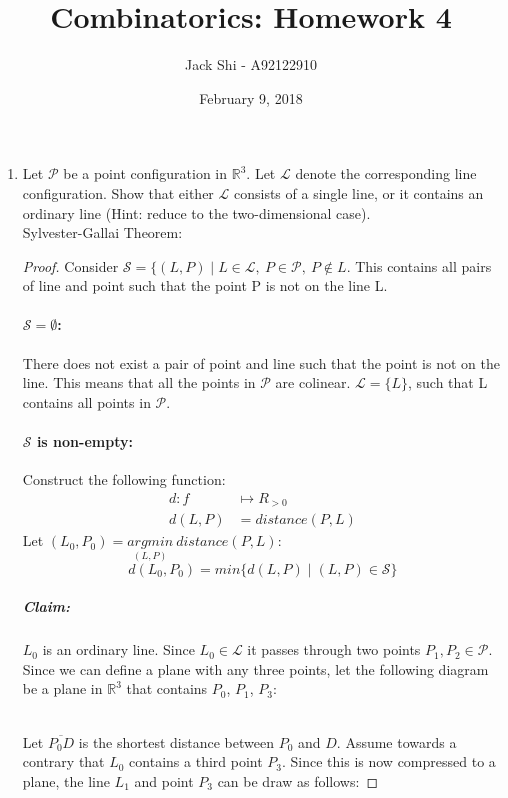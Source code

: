 \documentclass{article}
\title{Combinatorics: Homework 4}
\author{Jack Shi - A92122910}
\date{February 9, 2018}
\begin{document}
\maketitle

\begin{enumerate} [label=\textbf{\arabic*}.]
	\item Let $\mathcal{P}$ be a point configuration in $\mathbb{R}^3$. Let
		$\mathcal{L}$ denote the corresponding line configuration. Show that either
		$\mathcal{L}$ consists of a single line, or it contains an ordinary line
		(Hint: reduce to the two-dimensional case).\\
	
		Sylvester-Gallai Theorem:
		\begin{proof}
			Consider $\mathcal{S} = \{(L,P)\mid L\in\mathcal{L},\ P\in\mathcal{P},\
			P\not\in L$. This contains all pairs of line and point such that the point
			P is not on the line L.
			\paragraph{$\mathcal{S}=\emptyset$: } There does not exist a pair of point and line
			such that the point is not on the line. This means that all the points in
			$\mathcal{P}$ are colinear. $\mathcal{L}=\{L\}$, such that L contains all
			points in $\mathcal{P}$.
			\paragraph{$\mathcal{S}$ is non-empty: } Construct the following function:
			\begin{align*}
				d:f &\mapsto R_{>0}\\
				d(L,P) &= distance(P,L)
			\end{align*}
			Let $(L_0,P_0) = \underset{(L,P)}{argmin}\ distance(P,L)$:
				$$d(L_0,P_0)=min\{d(L,P)\mid (L,P) \in \mathcal{S}\}$$
			\subparagraph{Claim: } $L_0$ is an ordinary line.
			Since $L_0 \in \mathcal{L}$ it passes through two points $P_1,P_2 \in
			\mathcal{P}$. Since we can define a plane with any three points, let the
			following diagram be a plane in $\mathbb{R}^3$ that contains $P_0$, $P_1$,
			$P_3$:

			\\
			Let $\overline{P_0 D}$ is the shortest distance between $P_0$ and $D$.
			Assume towards a contrary that $L_0$ contains a third point $P_3$. Since
			this is now compressed to a plane, the line $L_1$ and point $P_3$ can be
			draw as follows:


\end{proof}
\end{enumerate}
\end{document}
